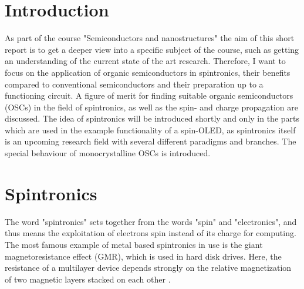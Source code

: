 


\section{Introduction}
\label{sec:Introduction}
As part of the course "Semiconductors and nanostructures" the aim of this short report is to get a deeper view into a specific subject of the course, such as getting an understanding of the current state of the art research.
Therefore, I want to focus on the application of organic semiconductors in spintronics, their benefits compared to conventional semiconductors and their preparation up to a functioning circuit.
A figure of merit for finding suitable organic semiconductors (OSCs) in the field of spintronics, as well as the spin- and charge propagation are discussed.
The idea of spintronics will be introduced shortly and only in the parts which are used in the example functionality of a spin-OLED, as spintronics itself is an upcoming research field with several different paradigms and branches.
The special behaviour of monocrystalline OSCs is introduced.%

\section{Spintronics}
\label{sec:spintronics}

The word "spintronics" sets together from the words "spin" and "electronics", and thus means the exploitation of electrons spin instead of its charge for computing.
The most famous example of metal based spintronics in use is the giant magnetoresistance effect (GMR), which is used in hard disk drives.
Here, the resistance of a multilayer device depends strongly on the relative magnetization of two magnetic layers stacked on each other \cite{perovskite}.

